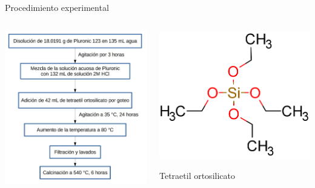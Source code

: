 \documentclass[handout]{beamer}
\begin{document}
\begin{frame}{Procedimiento experimental}
	\begin{columns}
		\begin{column}{0.5\textwidth}
			\includegraphics[width=\linewidth]{experimental1.jpg}
		\end{column}
		\begin{column}{0.5\textwidth}
			{\raggedright
			\includegraphics[width=0.5\linewidth]{../structures/silicate.png}
			
			Tetraetil ortosilicato
			}
		\end{column}
	\end{columns}
	
\end{frame}
\end{document}
